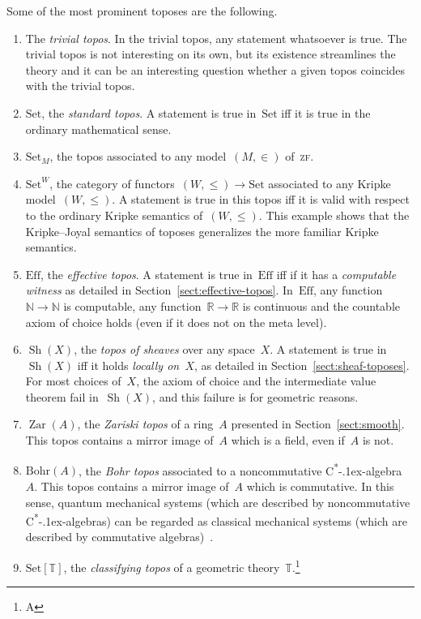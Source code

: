 \documentclass[oneside,reqno]{amsart}
\theoremstyle{definition}
\theoremstyle{plain}
\theoremstyle{remark}
\newcommand{\NN}{\mathbb{N}}
\newcommand{\TT}{\mathbb{T}}
\newcommand{\RR}{\mathbb{R}}
\DeclareMathOperator{\Sh}{Sh}
\DeclareMathOperator{\Zar}{Zar}
\newcommand{\Set}{\mathrm{Set}}
\newcommand{\Eff}{\mathrm{Ef{}f}}
\renewcommand{\_}{\mathpunct{.}\,}
\newcommand{\effective}{ef{}fective\xspace}
\newcommand{\?}{\,{:}\,}
\begin{document}
Some of the most prominent toposes are the following.

\begin{enumerate}
\item The \emph{trivial topos}. In the trivial topos, any statement whatsoever
is true. The trivial topos is not interesting on its own, but its existence
streamlines the theory and it can be an interesting question whether a given
topos coincides with the trivial topos.
\item $\Set$, the \emph{standard topos}. A statement is true in~$\Set$ iff it is true
in the ordinary mathematical sense.
\item $\Set_M$, the topos associated to any model~$(M,\in)$ of~\textsc{zf}.
\item $\Set^W$, the category of functors~$(W,\leq) \to \Set$ associated to
any Kripke model~$(W,\leq)$. A statement is true in this topos iff it is valid
with respect to the ordinary Kripke semantics of~$(W,\leq)$. This example shows
that the Kripke--Joyal semantics of toposes generalizes the more familiar
Kripke semantics.
\item $\Eff$, the \emph{\effective topos}. A statement is true in~$\Eff$ iff
if it has a \emph{computable witness} as detailed in
Section~\ref{sect:effective-topos}. In~$\Eff$, any function~$\NN \to \NN$ is
computable, any function~$\RR \to \RR$ is continuous and the countable axiom of
choice holds (even if it does not on the meta level).
\item $\Sh(X)$, the \emph{topos of sheaves} over any space~$X$. A statement is true
in~$\Sh(X)$ iff it holds \emph{locally on~$X$}, as detailed in
Section~\ref{sect:sheaf-toposes}. For most choices of~$X$, the
axiom of choice and the intermediate value theorem fail in~$\Sh(X)$, and this
failure is for geometric reasons.
\item $\Zar(A)$, the \emph{Zariski topos} of a ring~$A$ presented in
Section~\ref{sect:smooth}. This topos contains a mirror
image of~$A$ which is a field, even if~$A$ is not.
\item $\mathrm{Bohr}(A)$, the \emph{Bohr topos} associated to a noncommutative
C\textsuperscript{*}\kern-.1ex-algebra~$A$. This topos contains a mirror image
of~$A$ which is commutative. In this sense, quantum mechanical systems (which are
described by noncommutative C\textsuperscript{*}\kern-.1ex-algebras) can be
regarded as classical mechanical systems (which are described by commutative
algebras)~\cite{butterfield-hamilton-isham:bohr,heunen-landsman-spitters:aqt}.
\item $\Set[\TT]$, the \emph{classifying topos} of a geometric theory~$\TT$.\footnote{A
}
\end{enumerate}
\end{document}
